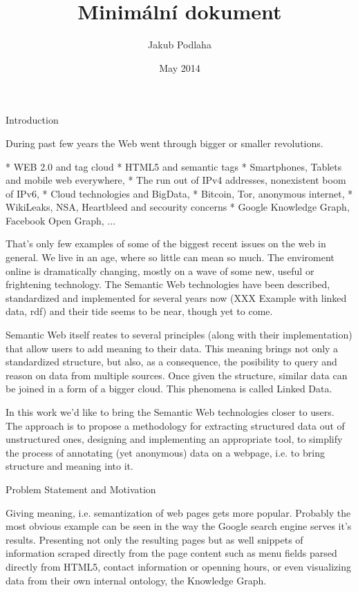 
\worktype [M/CZ]
\title {Minimální dokument}
\author {Jakub Podlaha}
\date {May 2014}
\makefront



\chap Introduction

During past few years the Web went through bigger or smaller revolutions. 

\begitems
  * WEB 2.0 and tag cloud
  * HTML5 and semantic tags
  * Smartphones, Tablets and mobile web everywhere, 
  * The run out of IPv4 addresses, nonexistent boom of IPv6, 
  * Cloud technologies and BigData, 
  * Bitcoin, Tor, anonymous internet, 
  * WikiLeaks, NSA, Heartbleed and secourity concerns
  * Google Knowledge Graph, Facebook Open Graph, ...
\enditems

That's only few examples of some of the biggest recent issues on the web in
general. We live in an age, where so little can mean so much. The enviroment
online is dramatically changing, mostly on a wave of some new, useful or
frightening technology. The Semantic Web technologies have been described,
standardized and implemented for several years now  (XXX Example with linked
data, rdf) and their tide seems to be near, though yet to come.

Semantic Web itself reates to several principles (along with their
implementation) that allow users to add meaning to their data. This meaning
brings not only a standardized structure, but also, as a consequence, the
posibility to query and reason on data from multiple sources. Once given the
structure, similar data can be joined in a form of a bigger cloud. This
phenomena is called Linked Data. 

In this work we'd like to bring the Semantic Web technologies closer to users.
The approach is to propose a methodology for extracting structured data out of
unstructured ones, designing and implementing an appropriate tool, to simplify
the process of annotating (yet anonymous) data on a webpage, i.e. to bring
structure and meaning into it. 



\sec Problem Statement and Motivation

Giving meaning, i.e. semantization of web pages gets more popular. Probably the most
obvious example can be seen in the way the Google search engine serves it's
results. Presenting not only the resulting pages but as well snippets of
information scraped directly from the page content such as menu fields parsed
directly from HTML5, contact information or openning hours, or even visualizing
data from their own internal ontology, the Knowledge Graph. 


